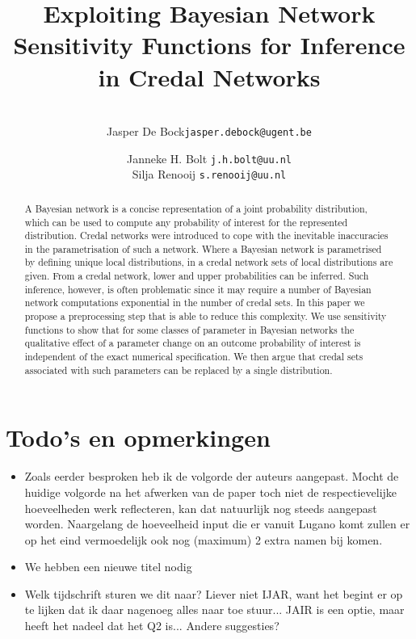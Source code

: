\documentclass[10pt,a4paper]{paper}
\title{Exploiting Bayesian Network Sensitivity Functions for Inference in Credal Networks}
\author{\vspace{-10pt}~\\\normalfont Jasper De Bock\large\hfill\texttt{jasper.debock@ugent.be}}
\affil{Ghent University\\
 Department of Electronics and Information Systems\\
Technologiepark -- Zwijnaarde 914 \\
9052 Zwijnaarde \\ 
Belgium
\vspace{-5pt}
}
\author{\normalfont Janneke H. Bolt
\large\hfill\texttt{j.h.bolt@uu.nl}\\[8pt]
\Large\normalfont Silja Renooij
\large\hfill\texttt{s.renooij@uu.nl}}
\affil{Utrecht University\\
Department of Information and Computing Sciences\\Princetonplein 5, De Uithof \\
3584 CC Utrecht \\
The Netherlands
\vspace{10pt}
}
\theoremstyle{definition}
\begin{document}
\date{}
\maketitle


\begin{abstract}
A Bayesian network is a concise representation of a joint probability distribution, which can be used to compute any probability of interest for the represented distribution.  Credal networks were introduced to cope with the inevitable inaccuracies in the parametrisation of such a network. Where a Bayesian network is parametrised by defining unique local distributions, in a credal network sets of local distributions are given. From a credal network, lower and upper probabilities can be inferred. Such inference, however, is often problematic since it may require a number of Bayesian network computations exponential in the number of credal sets. In this paper we propose a preprocessing step that is able to reduce this complexity. We use sensitivity functions to show that for some classes of parameter in Bayesian networks the qualitative effect of a parameter change on an outcome probability of interest is independent of the exact numerical specification. We then argue that credal sets associated with such parameters can be replaced by a single distribution.
\end{abstract}

\section*{Todo's en opmerkingen}

\begin{itemize}
\item
Zoals eerder besproken heb ik de volgorde der auteurs aangepast. Mocht de huidige volgorde na het afwerken van de paper toch niet de respectievelijke hoeveelheden werk reflecteren, kan dat natuurlijk nog steeds aangepast worden. Naargelang de hoeveelheid input die er vanuit Lugano komt zullen er op het eind vermoedelijk ook nog (maximum) 2 extra namen bij komen.
\item
We hebben een nieuwe titel nodig
\item
Welk tijdschrift sturen we dit naar? Liever niet IJAR, want het begint er op te lijken dat ik daar nagenoeg alles naar toe stuur... JAIR is een optie, maar heeft het nadeel dat het Q2 is... {\color{red}Andere suggesties?}
\end{itemize}
\end{document}
